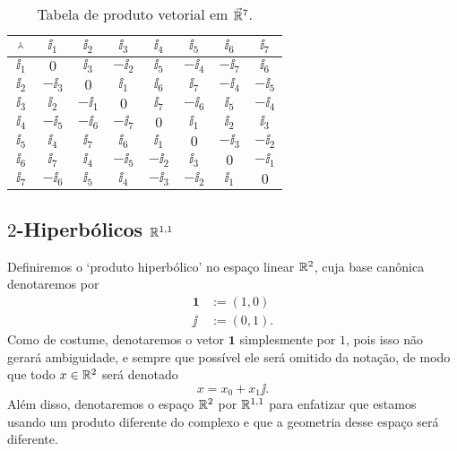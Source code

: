 \begin{table}
	\centering

	\begin{tabular}{c | c c c c c c c}
	\toprule
	${} \Yup {}$&	$\ii_1$	&	$\ii_2$	&	$\ii_3$	&	$\ii_4$	&	$\ii_5$	&	$\ii_6$	&	$\ii_7$		\\
	\hline
	$\ii_1$	&	$0$		&	$\ii_3$	&	$-\ii_2$&	$\ii_5$	&	$-\ii_4$&	$-\ii_7$&	$\ii_6$		\\
	$\ii_2$	&	$-\ii_3$&	$0$		&	$\ii_1$	&	$\ii_6$	&	$\ii_7$	&	$-\ii_4$&	$-\ii_5$	\\
	$\ii_3$	&	$\ii_2$	&	$-\ii_1$&	$0$		&	$\ii_7$	&	$-\ii_6$&	$\ii_5$	&	$-\ii_4$	\\
	$\ii_4$	&	$-\ii_5$&	$-\ii_6$&	$-\ii_7$&	$0$		&	$\ii_1$	&	$\ii_2$	&	$\ii_3$		\\
	$\ii_5$	&	$\ii_4$	&	$\ii_7$	&	$\ii_6$	&	$\ii_1$	&	$0$		&	$-\ii_3$&	$-\ii_2$	\\
	$\ii_6$	&	$\ii_7$	&	$\ii_4$	&	$-\ii_5$&	$-\ii_2$&	$\ii_3$	&	$0$		&	$-\ii_1$	\\
	$\ii_7$	&	$-\ii_6$&	$\ii_5$	&	$\ii_4$	&	$-\ii_3$&	$-\ii_2$&	$\ii_1$	&	$0$			\\
	\bottomrule
	\end{tabular}

	\caption{Tabela de produto vetorial em $\vec{\mathbb{R}}^7$.}
	\label{tab:multiplicacao.octonionica.vetorial}
\end{table}


















\subsection{$2$-Hiperbólicos \texorpdfstring{$\mathbb{R}^{1,1}$}{}}

Definiremos o `produto hiperbólico' no espaço linear $\mathbb{R}^2$, cuja base canônica denotaremos por
	\begin{align*}
	\bm 1 &:= (1,0) \\
	\jj &:= (0,1).
	\end{align*}
Como de costume, denotaremos o vetor $\bm 1$ simplesmente por $1$, pois isso não gerará ambiguidade, e sempre que possível ele será omitido da notação, de modo que todo $x \in \mathbb{R}^2$ será denotado
	\begin{equation*}
	x = x_0 + x_1 \jj.
	\end{equation*}
Além disso, denotaremos o espaço $\mathbb{R}^2$ por $\mathbb{R}^{1,1}$ para enfatizar que estamos usando um produto diferente do complexo e que a geometria desse espaço será diferente.


